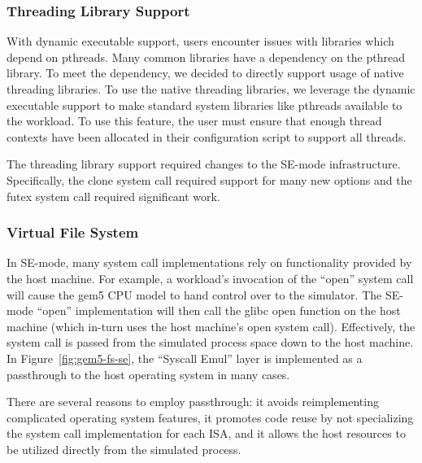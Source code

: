 \subsubsection{Threading Library Support}

With dynamic executable support, users encounter issues with libraries which depend on pthreads.
Many common libraries have a dependency on the pthread library.
To meet the dependency, we decided to directly support usage of native threading libraries.
To use the native threading libraries, we leverage the dynamic executable support to make standard system libraries like pthreads available to the workload.
To use this feature, the user must ensure that enough thread contexts have been allocated in their configuration script to support all threads.


The threading library support required changes to the SE-mode infrastructure.
Specifically, the clone system call required support for many new options and the futex system call required significant work.

\subsubsection{Virtual File System}
\label{sec:vfs}

In SE-mode, many system call implementations rely on functionality provided by the host machine.
For example, a workload's invocation of the ``open'' system call will cause the gem5 CPU model to hand control over to the simulator.
The SE-mode ``open'' implementation will then call the glibc open function on the host machine (which in-turn uses the host machine's open system call).
Effectively, the system call is passed from the simulated process space down to the host machine.
In Figure~\ref{fig:gem5-fs-se}, the ``Syscall Emul'' layer is implemented as a passthrough to the host operating system in many cases.

There are several reasons to employ passthrough: it avoids reimplementing complicated operating system features, it promotes code reuse by not specializing the system call implementation for each ISA, and it allows the host resources to be utilized directly from the simulated process.

